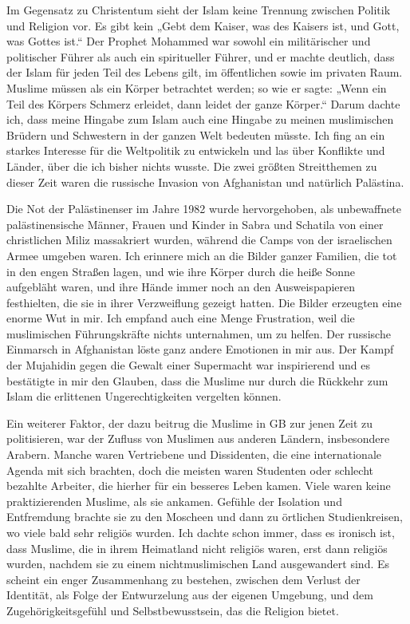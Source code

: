 \documentclass[12pt]{memoir}
\begin{document}
Im Gegensatz zu Christentum sieht der Islam
keine Trennung zwischen Politik und Religion vor.
Es gibt kein „Gebt dem Kaiser, was des Kaisers ist,
und Gott, was Gottes ist.“
Der Prophet Mohammed war sowohl ein militärischer und politischer Führer
als auch ein spiritueller Führer,
und er machte deutlich, dass der Islam für jeden Teil des Lebens gilt,
im öffentlichen sowie im privaten Raum.
Muslime müssen als ein Körper betrachtet werden; so wie er sagte:
„Wenn ein Teil des Körpers Schmerz erleidet, dann leidet der ganze Körper.“
Darum dachte ich, dass meine Hingabe zum Islam auch eine Hingabe
zu meinen muslimischen Brüdern und Schwestern in der ganzen Welt bedeuten müsste.
Ich fing an ein starkes Interesse für die Weltpolitik zu entwickeln
und las über Konflikte und Länder, über die ich bisher nichts wusste.
Die zwei größten Streitthemen zu dieser Zeit waren
die russische Invasion von Afghanistan und natürlich Palästina.

Die Not der Palästinenser im Jahre 1982 wurde hervorgehoben,
als unbewaffnete palästinensische Männer, Frauen und Kinder
in Sabra und Schatila von einer christlichen Miliz massakriert wurden,
während die Camps von der israelischen Armee umgeben waren.
Ich erinnere mich an die Bilder ganzer Familien,
die tot in den engen Straßen lagen,
und wie ihre Körper durch die heiße Sonne aufgebläht waren,
und ihre Hände immer noch an den Ausweispapieren festhielten,
die sie in ihrer Verzweiflung gezeigt hatten.
Die Bilder erzeugten eine enorme Wut in mir.
Ich empfand auch eine Menge Frustration,
weil die muslimischen Führungskräfte nichts unternahmen, um zu helfen.
Der russische Einmarsch in Afghanistan löste ganz andere Emotionen in mir aus.
Der Kampf der Mujahidin gegen die Gewalt einer Supermacht war inspirierend
und es bestätigte in mir den Glauben,
dass die Muslime nur durch die Rückkehr zum Islam
die erlittenen Ungerechtigkeiten vergelten können.

Ein weiterer Faktor, der dazu beitrug die Muslime in GB
zur jenen Zeit zu politisieren,
war der Zufluss von Muslimen aus anderen Ländern, insbesondere Arabern.
Manche waren Vertriebene und Dissidenten,
die eine internationale Agenda mit sich brachten,
doch die meisten waren Studenten oder schlecht bezahlte Arbeiter,
die hierher für ein besseres Leben kamen.
Viele waren keine praktizierenden Muslime, als sie ankamen.
Gefühle der Isolation und Entfremdung brachte sie zu den Moscheen
und dann zu örtlichen Studienkreisen, wo viele bald sehr religiös wurden.
Ich dachte schon immer, dass es ironisch ist, dass Muslime,
die in ihrem Heimatland nicht religiös waren,
erst dann religiös wurden,
nachdem sie zu einem nicht\–muslimischen Land ausgewandert sind.
Es scheint ein enger Zusammenhang zu bestehen,
zwischen dem Verlust der Identität,
als Folge der Entwurzelung aus der eigenen Umgebung,
und dem Zugehörigkeitsgefühl und Selbstbewusstsein, das die Religion bietet.
\end{document}

